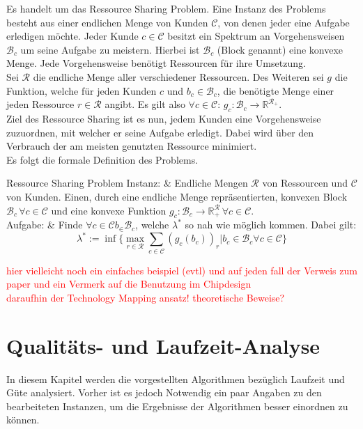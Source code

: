 \documentclass[11pt, a4paper, german]{article}
\newcommand{\TM}{Technology  Mapping }
\begin{document}
Es handelt um das Ressource Sharing Problem. Eine Instanz des Problems besteht aus einer endlichen Menge von Kunden $\mathcal{C}$, von denen jeder eine Aufgabe erledigen möchte.  Jeder Kunde $c \in \mathcal{C}$ besitzt ein Spektrum an Vorgehensweisen $\mathcal{B}_c$ um seine Aufgabe zu meistern. Hierbei ist $\mathcal{B}_c$ (Block genannt) eine konvexe Menge. Jede Vorgehensweise benötigt Ressourcen für ihre Umsetzung. \\
Sei $\mathcal{R}$ die endliche  Menge aller verschiedener Ressourcen.  Des Weiteren sei $g$ die Funktion, welche für jeden Kunden $c$ und $b_c \in \mathcal{B}_c$, die benötigte Menge einer jeden Ressource $r \in \mathcal{R}$ angibt. Es gilt also $\forall c \in \mathcal{C}: \, g_c:\mathcal{B}_c \rightarrow \mathbb{R}^{\mathcal{R}_+}$. \\
Ziel des Ressource Sharing ist es nun, jedem Kunden eine Vorgehensweise zuzuordnen, mit welcher er seine Aufgabe erledigt. Dabei wird über den Verbrauch der am meisten genutzten Ressource minimiert. \\
Es folgt die formale Definition des Problems. \\
\begin{problem}[framed]{Ressource Sharing Problem}
  Instanz:  & Endliche Mengen $\mathcal{R}$ von Ressourcen und $\mathcal{C}$ von Kunden. Einen, durch eine endliche Menge repräsentierten,  konvexen Block $\mathcal{B}_c \, \forall c \in \mathcal{C}$ und eine konvexe Funktion $g_c: \mathcal{B}_c \rightarrow \mathbb{R}^{\mathcal{R}}_+ \, \forall c \in \mathcal{C}$.\\
  Aufgabe: & Finde $\forall c \in \mathcal{C} b_ \in \mathcal{B}_c$, welche $\lambda ^*$ so nah wie möglich kommen. Dabei gilt: \[\lambda^* := \inf \{ \max\limits_{r \in \mathcal{R}} \sum\limits_{c \in \mathcal{C}}  (g_c(b_c))_r | b_c \in \mathcal{B}_c \forall c \in \mathcal{C} \}\]
\end{problem}
\textcolor{red}{hier vielleicht noch ein einfaches beispiel (evtl) und auf jeden fall der Verweis zum paper und ein Vermerk auf die Benutzung im Chipdesign \\ daraufhin der \TM ansatz! theoretische Beweise?}


\section{Qualitäts- und Laufzeit-Analyse}
\label{sec:analyse}
In diesem Kapitel werden die vorgestellten Algorithmen bezüglich Laufzeit und Güte analysiert. Vorher ist es jedoch Notwendig ein paar Angaben zu den bearbeiteten Instanzen, um die Ergebnisse der Algorithmen besser einordnen zu können.
\end{document}
